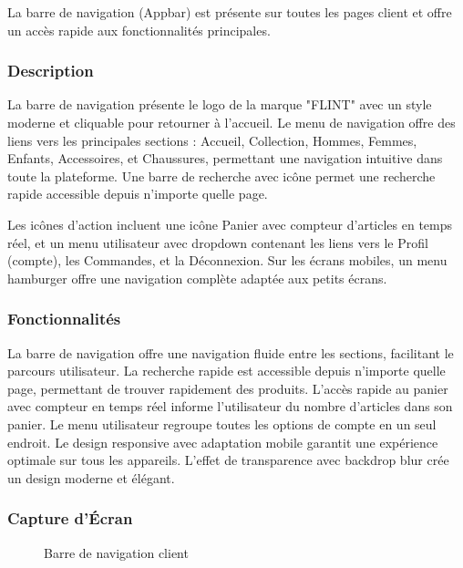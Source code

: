 \documentclass[12pt,a4paper]{article}
\begin{document}
La barre de navigation (Appbar) est présente sur toutes les pages client et offre un accès rapide aux fonctionnalités principales.

\subsubsection{Description}

La barre de navigation présente le logo de la marque "FLINT" avec un style moderne et cliquable pour retourner à l'accueil. Le menu de navigation offre des liens vers les principales sections : Accueil, Collection, Hommes, Femmes, Enfants, Accessoires, et Chaussures, permettant une navigation intuitive dans toute la plateforme. Une barre de recherche avec icône permet une recherche rapide accessible depuis n'importe quelle page.

Les icônes d'action incluent une icône Panier avec compteur d'articles en temps réel, et un menu utilisateur avec dropdown contenant les liens vers le Profil (compte), les Commandes, et la Déconnexion. Sur les écrans mobiles, un menu hamburger offre une navigation complète adaptée aux petits écrans.

\subsubsection{Fonctionnalités}

La barre de navigation offre une navigation fluide entre les sections, facilitant le parcours utilisateur. La recherche rapide est accessible depuis n'importe quelle page, permettant de trouver rapidement des produits. L'accès rapide au panier avec compteur en temps réel informe l'utilisateur du nombre d'articles dans son panier. Le menu utilisateur regroupe toutes les options de compte en un seul endroit. Le design responsive avec adaptation mobile garantit une expérience optimale sur tous les appareils. L'effet de transparence avec backdrop blur crée un design moderne et élégant.

\subsubsection{Capture d'Écran}

\begin{figure}[H]
    \centering
    \caption{Barre de navigation client}
    \label{fig:navbar}
\end{figure}
\end{document}
